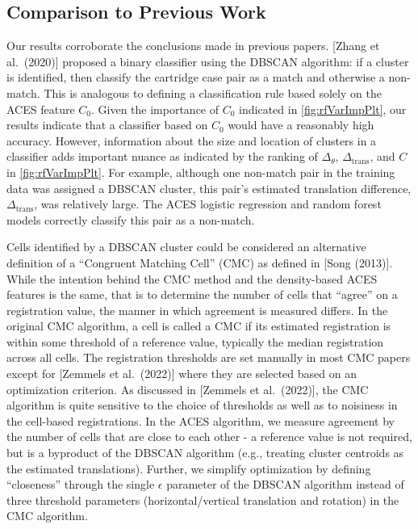 \documentclass[
]{jdssv}
\begin{document}
\hypertarget{comparison-to-previous-work}{%
\subsection{Comparison to Previous
Work}\label{comparison-to-previous-work}}

Our results corroborate the conclusions made in previous papers.
{[}Zhang et al.~(2020){]} proposed a binary classifier using the DBSCAN
algorithm: if a cluster is identified, then classify the cartridge case
pair as a match and otherwise a non-match. This is analogous to defining
a classification rule based solely on the ACES feature \(C_0\). Given
the importance of \(C_0\) indicated in \autoref{fig:rfVarImpPlt}, our
results indicate that a classifier based on \(C_0\) would have a
reasonably high accuracy. However, information about the size and
location of clusters in a classifier adds important nuance as indicated
by the ranking of \(\Delta_{\theta}\), \(\Delta_{\text{trans}}\), and
\(C\) in \autoref{fig:rfVarImpPlt}. For example, although one non-match
pair in the training data was assigned a DBSCAN cluster, this pair's
estimated translation difference, \(\Delta_{\text{trans}}\), was
relatively large. The ACES logistic regression and random forest models
correctly classify this pair as a non-match.

Cells identified by a DBSCAN cluster could be considered an alternative
definition of a ``Congruent Matching Cell'' (CMC) as defined in {[}Song
(2013){]}. While the intention behind the CMC method and the
density-based ACES features is the same, that is to determine the number
of cells that ``agree'' on a registration value, the manner in which
agreement is measured differs. In the original CMC algorithm, a cell is
called a CMC if its estimated registration is within some threshold of a
reference value, typically the median registration across all cells. The
registration thresholds are set manually in most CMC papers except for
{[}Zemmels et al.~(2022){]} where they are selected based on an
optimization criterion. As discussed in {[}Zemmels et al.~(2022){]}, the
CMC algorithm is quite sensitive to the choice of thresholds as well as
to noisiness in the cell-based registrations. In the ACES algorithm, we
measure agreement by the number of cells that are close to each other -
a reference value is not required, but is a byproduct of the DBSCAN
algorithm (e.g., treating cluster centroids as the estimated
translations). Further, we simplify optimization by defining
``closeness'' through the single \(\epsilon\) parameter of the DBSCAN
algorithm instead of three threshold parameters (horizontal/vertical
translation and rotation) in the CMC algorithm.
\end{document}
